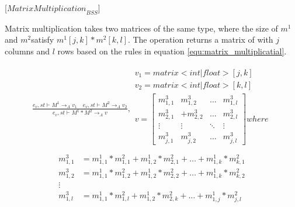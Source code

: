 [${MatrixMultiplication}_{BSS}$]

Matrix multiplication takes two matrices of the same type, where the size of $m^{1}$ and $m^{2}$satisfy $m^{1}[j,k]*m^{2}[k,l]$.
The operation returns a matrix of with $j$ columns and $l$ rows based on the rules in equation \ref{equ:matrix_multiplicatial}.


\begin{minipage}{1.0\textwidth}
\begin{equation} \label{equ:matrix_multiplicatial} 
\begin{aligned}
	\frac { { e }_{ v },st\vdash { M }^{ 1 }{ \rightarrow  }_{ A }{ v }_{ 1 }\quad { e }_{ v },st\vdash { M }^{ 2 }{ \rightarrow  }_{ A }{ v }_{ 2 } }{ { e }_{ v },st\vdash { M }^{ 1 }*{ M }^{ 2 }{ \rightarrow  }_{ A }{ v } } ,\begin{matrix} { v }_{ 1 }=matrix<int|float>[j,k] \\ { v }_{ 2 }=matrix<int|float>[k,l] \\
	 v=\begin{bmatrix} { { m }_{ 1,1 }^{ 3 } } & { { m }_{ 1,2 }^{ 3 } } & \dots  & { m }_{ 1,l }^{ 3 }\\
{ { m }_{ 2,1 }^{ 3 } } &   +{ { m }_{ 2,2 }^{ 3 } } & \dots & { { m }_{ 2,l }^{ 3 } }
\\ \vdots  & \vdots & \ddots  & \vdots  \\
 { m }_{ j,1 }^{ 3 }& { { m }_{ j,2 }^{ 3 } } & \dots & { m }_{ j,l }^{ 3 } \end{bmatrix} where
\\ \end{matrix}
\end{aligned}
\end{equation}
\begin{equation*}
\begin{aligned}
{ { m }_{ 1,1 }^{ 3 } }  &= { { m }_{ 1,1 }^{ 1 } } *{ { m }_{ 1,1 }^{ 2 } }+ { { m }_{ 1,2 }^{ 1 } } *{ { m }_{ 2,1 }^{ 2 } }+\dots+ { { m }_{ 1,k }^{ 1 } } *{ { m }_{ k,1 }^{ 2 } }\\
{ { m }_{ 1,2 }^{ 3 } }  &= { { m }_{ 1,1 }^{ 1 } } *{ { m }_{ 1,2 }^{ 2 } }+ { { m }_{ 1,2 }^{ 1 } } *{ { m }_{ 2,2 }^{ 2 } }+\dots+ { { m }_{ 1,k }^{ 1 } } *{ { m }_{ k,2 }^{ 2 } }\\
\vdots\\
{ { m }_{ 1,l }^{ 3 } }  &= { { m }_{ 1,1 }^{ 1 } } *{ { m }_{ 1,l }^{ 2 } }+ { { m }_{ 1,2 }^{ 1 } } *{ { m }_{ 2,k }^{ 2 } }+\dots+ { { m }_{ 1,j }^{ 1 } } *{ { m }_{ j,l }^{ 2 } }\\

\end{aligned}
\end{equation*}
\end{minipage}
